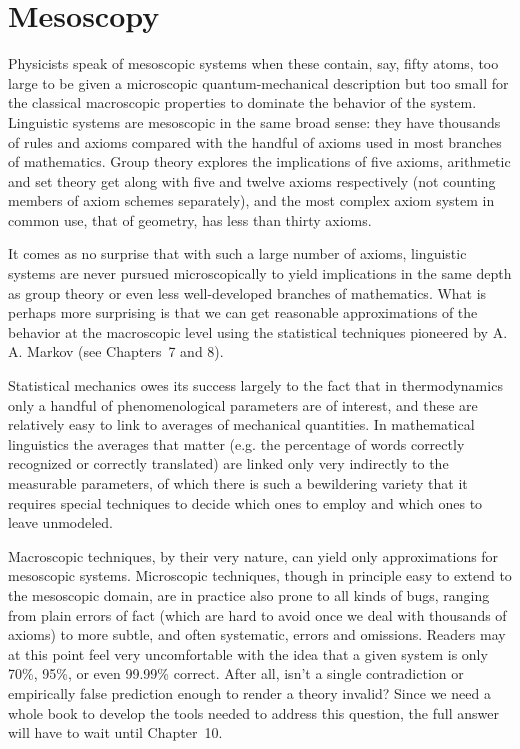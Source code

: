 \section{Mesoscopy}

Physicists speak of mesoscopic systems when these contain, say, fifty atoms,
too large to be given a microscopic quantum-mechanical description but too
small for the classical macroscopic properties to dominate the behavior of the
system. Linguistic systems are mesoscopic in the same broad sense: they have
thousands of rules and axioms compared with the handful of axioms used in most
branches of mathematics. Group theory explores the
implications of five axioms, arithmetic and set theory get along with five
and twelve axioms respectively (not counting members of axiom schemes
separately), and the most complex axiom system in common use, that of
geometry, has less than thirty axioms.

It comes as no surprise that with such a large number of axioms, linguistic
systems are never pursued microscopically to yield implications in the same
depth as group theory or even less well-developed branches of mathematics.
What is perhaps more surprising is that we can get reasonable approximations
of the behavior at the macroscopic level using the statistical techniques
pioneered by A. A. Markov (see Chapters~7 and 8). 

Statistical mechanics owes its success largely to the fact that in
thermodynamics only a handful of phenomenological parameters are of interest,
and these are relatively easy to link to averages of mechanical quantities.
In mathematical linguistics the averages that matter (e.g. the percentage 
of words correctly recognized or correctly translated) are linked only very 
indirectly to the measurable parameters, of which there is such a bewildering 
variety that it requires special techniques to decide which ones to employ
and which ones to leave unmodeled. 

Macroscopic techniques, by their very nature, can yield only approximations
for mesoscopic systems. Microscopic techniques, though in principle easy to
extend to the mesoscopic domain, are in practice also prone to all kinds of
bugs, ranging from plain errors of fact (which are hard to avoid once we deal
with thousands of axioms) to more subtle, and often systematic, errors and
omissions. Readers may at this point feel very uncomfortable with the idea
that a given system is only 70\%, 95\%, or even 99.99\% correct. After all,
isn't a single contradiction or empirically false prediction enough to render
a theory invalid? Since we need a whole book to develop the tools needed to
address this question, the full answer will have to wait until Chapter~10. 

